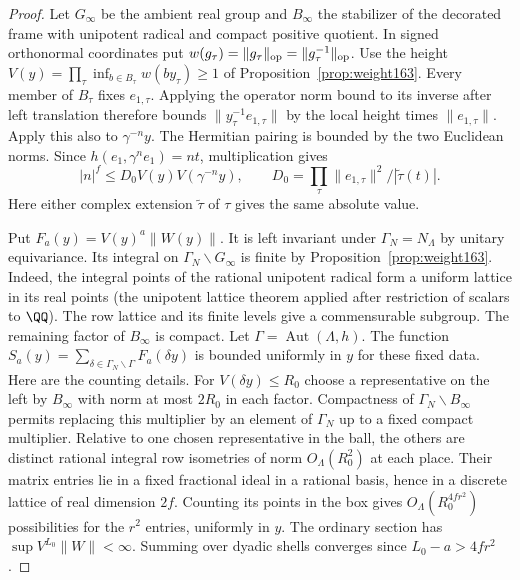 \documentclass[a4paper,11pt]{article}
\theoremstyle{definition}
\theoremstyle{remark}
\numberwithin{equation}{section}
\begin{document}
\begin{proof}
Let \(G_\infty\) be the ambient real group and \(B_\infty\)
the stabilizer of the decorated frame with unipotent radical
and compact positive quotient. In signed orthonormal coordinates
put \(w(g_\tau)=\|g_\tau\|_{\rm op}=\|g_\tau^{-1}\|_{\rm op}\).
Use the height
\(V(y)=\prod_\tau\inf_{b\in B_\tau}w(by_\tau)\ge1\) of
Proposition~\ref{prop:weight163}. Every member of \(B_\tau\)
fixes \(e_{1,\tau}\). Applying the operator norm bound to its
inverse after left translation therefore bounds
\(\|y_\tau^{-1}e_{1,\tau}\|\) by the local height times
\(\|e_{1,\tau}\|\). Apply this also to \(\gamma^{-n}y\).
The Hermitian pairing is bounded by the two Euclidean norms.
Since \(h(e_1,\gamma^ne_1)=nt\), multiplication gives
\[
      |n|^f\le D_0 V(y)V(\gamma^{-n}y),\qquad
      D_0=\prod_\tau\|e_{1,\tau}\|^2/|\widetilde\tau(t)|.
\]
Here either complex extension \(\widetilde\tau\) of \(\tau\)
gives the same absolute value.

Put \(F_a(y)=V(y)^a\|W(y)\|\). It is left invariant under
\(\Gamma_N=N_\Lambda\) by unitary equivariance. Its integral
on \(\Gamma_N\backslash G_\infty\) is finite by
Proposition~\ref{prop:weight163}. Indeed, the integral points
of the rational unipotent radical form a uniform lattice in
its real points (the unipotent lattice theorem applied after
restriction of scalars to \(\QQ\)). The row lattice and its
finite levels give a commensurable subgroup. The remaining
factor of \(B_\infty\) is compact. Let
\(\Gamma=\operatorname{Aut}(\Lambda,h)\).
The function \(S_a(y)=\sum_{\delta\in\Gamma_N\backslash\Gamma}
F_a(\delta y)\) is bounded uniformly in \(y\) for these fixed
data. Here are the counting details. For \(V(\delta y)\le R_0\)
choose a representative on the left by \(B_\infty\) with
norm at most \(2R_0\) in each factor. Compactness of
\(\Gamma_N\backslash B_\infty\) permits replacing this multiplier
by an element of \(\Gamma_N\) up to a fixed compact multiplier.
Relative to one chosen representative in the ball, the others
are distinct rational integral row isometries of norm
\(O_\Lambda(R_0^2)\) at each place. Their matrix entries lie
in a fixed fractional ideal in a rational basis, hence in a
discrete lattice of real dimension \(2f\). Counting its points
in the box gives \(O_\Lambda(R_0^{4fr^2})\) possibilities
for the \(r^2\) entries, uniformly in \(y\).
The ordinary section has \(\sup V^{L_0}\|W\|<\infty\).
Summing over dyadic shells converges since
\(L_0-a>4fr^2\).


\end{proof}
\end{document}
